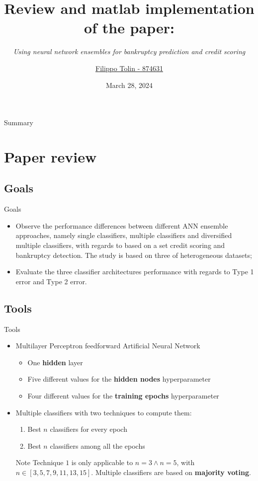 \documentclass[12pt]{beamer}
\title[EM2091]{Review and matlab implementation of the paper:} %
\subtitle{\textit{Using neural network ensembles for bankruptcy prediction and credit scoring}}
\author[Filippo Tolin]{
    \href{mailto:874631@stud.unive.it}{Filippo Tolin - 874631}
}
\institute[Ca' Foscari]{Ca' Foscari University of Venice }
\date{March 28, 2024}
\begin{document}
\begin{frame}
\titlepage
\end{frame}

\begin{frame}{Summary}
\tableofcontents 
\end{frame}

\section{Paper review}

\subsection{Goals}

\begin{frame}{Goals}
  \begin{itemize}
    \item Observe the performance differences between different ANN ensemble
      approaches, namely single classifiers,
      multiple classifiers and diversified multiple classifiers, with regards to based on a set
      credit scoring and bankruptcy detection. The study is based on three
      of heterogeneous datasets;
    \item Evaluate the three classifier architectures performance with regards to
      Type 1 error and Type 2 error.
  \end{itemize}
\end{frame}

\subsection{Tools}

\begin{frame}{Tools}
  \begin{itemize}
    \item Multilayer Perceptron feedforward Artificial Neural Network
      \begin{itemize}
        \item One \textbf{hidden} layer
        \item Five different values for the \textbf{hidden nodes} hyperparameter
        \item Four different values for the \textbf{training epochs} hyperparameter
      \end{itemize}
    \item Multiple classifiers with two techniques to compute them:
      \begin{enumerate}
        \item Best $n$ classifiers for every epoch
        \item Best $n$ classifiers among all the epochs
      \end{enumerate}
      \begin{block}{Note}
        Technique $1$ is only applicable to $n=3 \wedge n=5$,
        with $n \in [3,5,7,9,11,13,15]$. Multiple classifiers are based on \textbf{majority voting}.
      \end{block}
  \end{itemize}
\end{frame}
\end{document}
